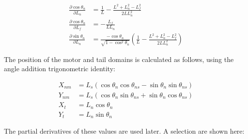 \documentclass[
11pt, %
english, %
singlespacing, %
headsepline, %
chapterinoneline, %
]{MastersDoctoralThesis} %
\begin{document}
\begin{align}
  \frac{\partial \cos\theta_n}{\partial L_n} &= \frac{1}{L} - \frac{L^2 + L_n^2 - L_f^2}{2L L_n^2}\\
  \frac{\partial \cos\theta_n}{\partial L_f} &= -\frac{L_f}{LL_n}\\
  \frac{\partial \sin\theta_n}{\partial L_n} &= \frac{-\cos\theta_n}{\sqrt{1-\cos^2\theta_n}}
  \left(\frac{1}{L} - \frac{L^2 + L_n^2 - L_f^2}{2L L_n^2}\right)
\end{align}

The position of the motor and tail domains is calculated as follows, using the angle addition trigonometric identity:

\begin{align}
  X_{nm} &= L_s\left(
  \cos\theta_n\cos\theta_{ns} - \sin\theta_n\sin\theta_{ns}
  \right)
  \\
  Y_{nm} &= L_s\left(
  \cos\theta_n\sin\theta_{ns} + \sin\theta_n\cos\theta_{ns}
  \right)
  \\
  X_{t} &= L_n\cos\theta_n\\
  Y_{t} &= L_n\sin\theta_n
\end{align}

The partial derivatives of these values are used later. A selection are shown here:
\end{document}
